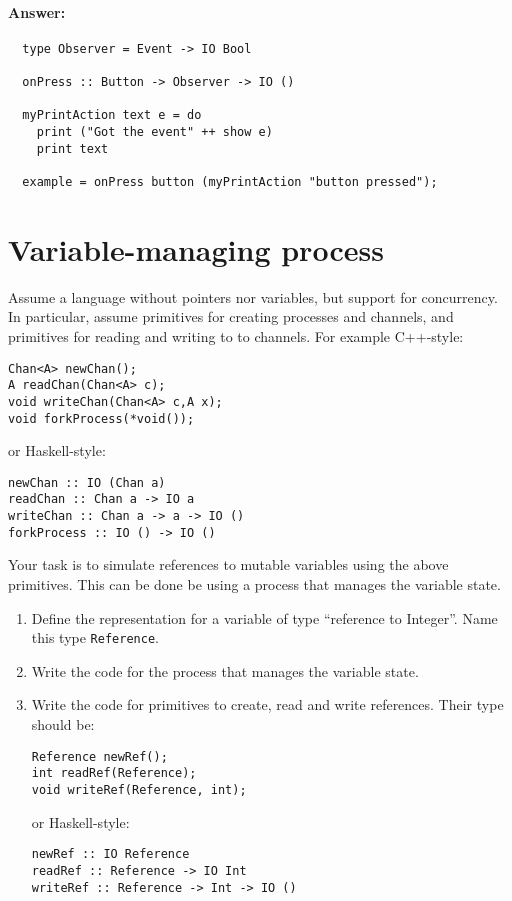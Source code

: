 \documentclass{article}
\newcommand{\answer}[0]{\paragraph{Answer:}}
\begin{document}
\answer{
\begin{verbatim}
  type Observer = Event -> IO Bool
  
  onPress :: Button -> Observer -> IO ()
  
  myPrintAction text e = do
    print ("Got the event" ++ show e)
    print text

  example = onPress button (myPrintAction "button pressed");
\end{verbatim}
}
\newpage
\section{Variable-managing process}

Assume a language without pointers nor variables, but support for
concurrency. In particular, assume primitives for creating processes
and channels, and primitives for reading and writing to to
channels. For example C++-style:

\begin{verbatim}
Chan<A> newChan();
A readChan(Chan<A> c);
void writeChan(Chan<A> c,A x);
void forkProcess(*void());
\end{verbatim}
or Haskell-style:
\begin{verbatim}
newChan :: IO (Chan a)
readChan :: Chan a -> IO a
writeChan :: Chan a -> a -> IO ()
forkProcess :: IO () -> IO ()
\end{verbatim}

Your task is to simulate references to mutable variables using the
above primitives. This can be done be using a process that manages the
variable state.

\begin{enumerate}
\item Define the representation for a variable of type ``reference to
  Integer''. Name this type \texttt{Reference}. 
\item Write the code for the process that manages the variable state. 
\item Write the code for primitives to create, read and write references. 
Their type should be:
\begin{verbatim}
Reference newRef();
int readRef(Reference);
void writeRef(Reference, int);
\end{verbatim}
or Haskell-style:
\begin{verbatim}
newRef :: IO Reference
readRef :: Reference -> IO Int
writeRef :: Reference -> Int -> IO ()
\end{verbatim}
\end{enumerate}
\end{document}
